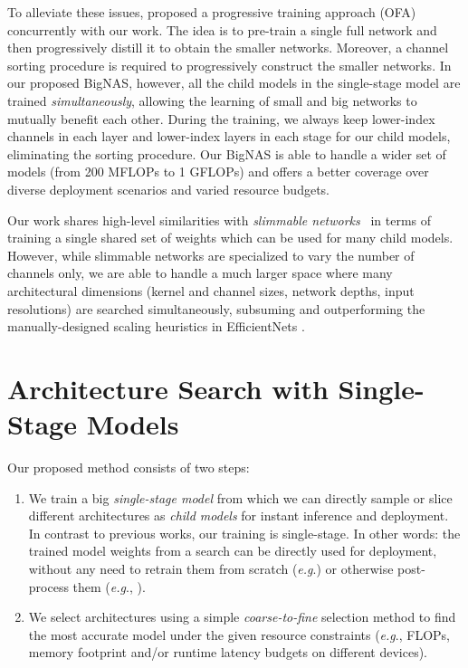 \documentclass[runningheads]{llncs}
\def\onedot{.}
\def\eg{\emph{e.g}\onedot} \def\Eg{\emph{E.g}\onedot}
\begin{document}
To alleviate these issues, \cite{cai2019once} proposed a progressive training approach (OFA) concurrently with our work. The idea is to pre-train a single full network and then progressively distill it to obtain the smaller networks. Moreover, a channel sorting procedure is required to progressively construct the smaller networks. In our proposed BigNAS, however, all the child models in the single-stage model are trained \emph{simultaneously}, allowing the learning of small and big networks to mutually benefit each other. During the training, we always keep lower-index channels in each layer and lower-index layers in each stage for our child models, eliminating the sorting procedure. Our BigNAS is able to handle a wider set of models (from 200 MFLOPs to 1 GFLOPs) and offers a better coverage over diverse deployment scenarios and varied resource budgets.

Our work shares high-level similarities with \emph{slimmable networks}~\cite{yu2018slimmable, yu2019universally, yu2019network} in terms of training a single shared set of weights which can be used for many child models. However, while slimmable networks are specialized to vary the number of channels only, we are able to handle a much larger space where many architectural dimensions (kernel and channel sizes, network depths, input resolutions) are searched simultaneously, subsuming and outperforming the manually-designed scaling heuristics in EfficientNets \cite{tan2019efficientnet}. 
\section{Architecture Search with Single-Stage Models}
Our proposed method consists of two steps:
\begin{enumerate}
    \item We train a big \textit{single-stage model} from which we can directly sample or slice different architectures as \textit{child models} for instant inference and deployment. In contrast to previous works, our training is single-stage. In other words: the trained model weights from a search can be directly used for deployment, without any need to retrain them from scratch (\eg \cite{brock2018smash, pham2018efficient, bender2018understanding, liu2018darts, stamoulis2019single, guo2019single, yu2019network}) or otherwise post-process them (\eg, \cite{cai2019once}).
    \item We select architectures using a simple \textit{coarse-to-fine} selection method to find the most accurate model under the given resource constraints (\eg, FLOPs, memory footprint and/or runtime latency budgets on different devices).
\end{enumerate}
\end{document}
